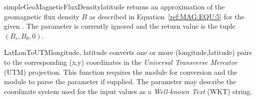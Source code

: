 \begin{funcdesc}{simpleGeoMagneticFluxDensity}{latitude%
}
returns an approximation of the geomagnetic flux density $B$ as described in
Equation~\ref{ref:MAG:EQU:5} for the given .
The  parameter is currently ignored and the return value is
the tuple $(B_r, B_{\theta}, 0)$.
\end{funcdesc}

\begin{funcdesc}{LatLonToUTM}{longitude, latitude%
}
converts one or more (longitude,latitude) pairs to the corresponding (x,y)
coordinates in the \emph{Universal Transverse Mercator} (UTM) projection.
This function requires the  module for conversion and the
 module to parse the  parameter if supplied.
The  parameter may describe the coordinate system used
for the input values as a \emph{Well-known Text} (WKT) string.
\end{funcdesc}

